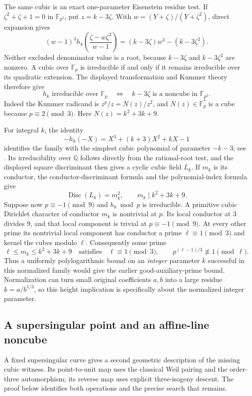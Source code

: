\documentclass[11pt]{article}
\theoremstyle{definition}
\theoremstyle{remark}
\begin{document}
The same cubic is an exact one-parameter Eisenstein residue
test.  If $\zeta^2+\zeta+1=0$ in $\mathbb F_{p^2}$, put
$z=k-3\zeta$.  With
$w=(Y+\zeta)/(Y+\zeta^2)$, direct expansion gives
\begin{equation}\label{eq:tate-eisenstein-radicand}
 (w-1)^3h_k\left(\frac{\zeta-w\zeta^2}{w-1}\right)
 =(k-3\zeta)w^3-(k-3\zeta^2).
\end{equation}
Neither excluded denominator value is a root, because
$k-3\zeta$ and $k-3\zeta^2$ are nonzero.  A cubic
over $\mathbb F_p$ is irreducible if and only if it
remains irreducible over its quadratic extension.
The displayed transformation and Kummer theory therefore
give
\[
 h_k\text{ irreducible over }\mathbb F_p
 \quad\Longleftrightarrow\quad
 k-3\zeta\text{ is a noncube in }\mathbb F_{p^2}.
\]
Indeed the Kummer radicand is $z^p/z=N(z)/z^2$,
and $N(z)\in\mathbb F_p^*$ is a cube because
$p\equiv2\pmod3$.  Here $N(z)=k^2+3k+9$.

For integral $k$, the identity
\[
 -h_k(-X)=X^3+(k+3)X^2+kX-1
\]
identifies the family with the simplest cubic polynomial
of parameter $-k-3$; see
\cite[\S1, (1.1)--(1.3)]{HashimotoAoki2024}.
Its irreducibility over $\mathbb Q$ follows directly from
the rational-root test, and the displayed square
discriminant then gives a cyclic cubic field $L_k$.
If $m_k$ is its conductor, the conductor-discriminant
formula and the polynomial-index formula give
\[
 \operatorname{Disc}(L_k)=m_k^2,
 \qquad m_k\mid k^2+3k+9.
\]
Suppose now $p\equiv-1\pmod9$ and $h_k\bmod p$ is
irreducible.  A primitive cubic Dirichlet character
of conductor $m_k$ is nontrivial at $p$.
Its local conductor at $3$ divides $9$, and that local
component is trivial at $p\equiv-1\pmod9$.
At every other prime its nontrivial local component
has conductor a prime $\ell\equiv1\pmod3$ and kernel
the cubes modulo $\ell$.
Consequently some prime
\[
 \ell\le m_k\le k^2+3k+9
 \quad\text{satisfies}\quad
 \ell\equiv1\pmod3,
 \qquad p^{(\ell-1)/3}\not\equiv1\pmod\ell.
\]
Thus a uniformly polylogarithmic bound on an \emph{integer}
parameter $k$ successful in this normalized family would
give the earlier good-auxiliary-prime bound.
Normalization can turn small original coefficients $a,b$
into a large residue $k=a/b^{1/3}$, so this height implication
is specifically about the normalized integer parameter.



\subsection{A supersingular point and an affine-line noncube}
A fixed supersingular curve gives a second geometric description of
the missing cubic witness.  Its point-to-unit map uses the classical
Weil pairing and the order-three automorphism; its reverse map uses
explicit three-isogeny descent.  The proof below identifies both
operations and the precise search that remains.
\end{document}
